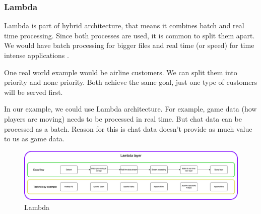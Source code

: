 \subsubsection{Lambda}\label{Lambda}

Lambda is part of hybrid architecture, that means it combines batch and real time processing. Since both processes are used, it is common to split them apart. We would have batch processing for bigger files and real time (or speed) for time intense applications \parencite{lin2017lambda}.

One real world example would be airline customers. We can split them into priority and none priority. Both achieve the same goal, just one type of customers will be served first.

In our example, we could use Lambda architecture. For example, game data (how players are moving) needs to be processed in real time. But chat data can be processed as a batch. Reason for this is chat data doesn't provide as much value to us as game data.

\begin{figure}[H]
\includegraphics[scale=0.25]{img/ProcessingParadigms/BigData-Lambda.png}
\centering
\caption{Lambda}
\label{fig:Lambda}
\end{figure}
